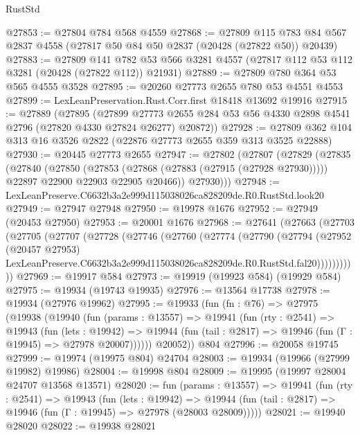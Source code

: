 \begin{lexlean}{RustStd}
\begin{coremodule}
@27853 := @27804 @784 @568 @4559
@27868 := @27809
    @115
    @783
    @84
    @567
    @2837
    @4558
    (@27817 @50 @84 @50 @2837 (@20428 (@27822 @50)) @20439)
@27883 := @27809
    @141
    @782
    @53
    @566
    @3281
    @4557
    (@27817 @112 @53 @112 @3281 (@20428 (@27822 @112)) @21931)
@27889 := @27809 @780 @364 @53 @565 @4555 @3528
@27895 := @20260 @27773 @2655 @780 @53 @4551 @4553
@27899 := LexLeanPreservation.Rust.Corr.first @18418 @13692 @19916
@27915 := @27889
    (@27895
      (@27899
        @27773
        @2655
        @284
        @53
        @56
        @4330
        @2898
        @4541
        @2796
        (@27820 @4330 @27824 @26277)
        @20872))
@27928 := @27809 @362 @104 @313 @16 @3526 @2822 (@22876 @27773 @2655 @359 @313 @3525 @22888)
@27930 := @20445 @27773 @2655
@27947 := @27802
    (@27807
      (@27829
        (@27835
          (@27840
            (@27850
              (@27853 (@27868 (@27883 (@27915 (@27928 @27930)))))
              @22897
              @22900
              @22903
              @22905
              @20466))
          @27930)))
@27948 := LexLeanPreserve.C6632b3a2e999d115038026ca828209de.R0.RustStd.look20
@27949 := @27947 @27948
@27950 := @19978 @1676
@27952 := @27949 (@20453 @27950)
@27953 := @20001 @1676
@27968 := @27641
    (@27663
      (@27703
        (@27705
          (@27707
            (@27728
              (@27746
                (@27760
                  (@27774
                    (@27790
                      (@27794
                        (@27952
                          (@20457 @27953)
                          LexLeanPreserve.C6632b3a2e999d115038026ca828209de.R0.RustStd.fal20)))))))))))
@27969 := @19917 @584
@27973 := @19919 (@19923 @584) (@19929 @584)
@27975 := @19934 (@19743 @19935)
@27976 := @13564 @17738
@27978 := @19934 (@27976 @19962)
@27995 := @19933
    (fun (fn : @76) =>
    @27975
      (@19938
        (@19940
          (fun (params : @13557) =>
          @19941
            (fun (rty : @2541) =>
            @19943
              (fun (lets : @19942) =>
              @19944 (fun (tail : @2817) => @19946 (fun (Γ : @19945) => @27978 @20007))))))
        @20052))
    @804
@27996 := @20058 @19745
@27999 := @19974 (@19975 @804) @24704
@28003 := @19934 (@19966 (@27999 @19982) @19986)
@28004 := @19998 @804
@28009 := @19995 (@19997 @28004 @24707 @13568 @13571)
@28020 := fun (params : @13557) =>
  @19941
    (fun (rty : @2541) =>
    @19943
      (fun (lets : @19942) =>
      @19944 (fun (tail : @2817) => @19946 (fun (Γ : @19945) => @27978 (@28003 @28009)))))
@28021 := @19940 @28020
@28022 := @19938 @28021

\end{coremodule}
\end{lexlean}
